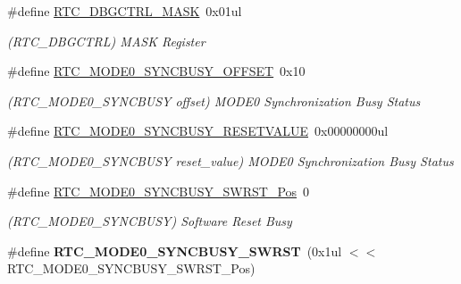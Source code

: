 \begin{DoxyCompactItemize}
\item 
\hypertarget{group___s_a_m_l21___r_t_c_ga67d70ebf86119e02a8b23f3a77ceda45}{}\#define \hyperlink{group___s_a_m_l21___r_t_c_ga67d70ebf86119e02a8b23f3a77ceda45}{R\+T\+C\+\_\+\+D\+B\+G\+C\+T\+R\+L\+\_\+\+M\+A\+S\+K}~0x01ul\label{group___s_a_m_l21___r_t_c_ga67d70ebf86119e02a8b23f3a77ceda45}

\begin{DoxyCompactList}\small\item\em (R\+T\+C\+\_\+\+D\+B\+G\+C\+T\+R\+L) M\+A\+S\+K Register \end{DoxyCompactList}\item 
\hypertarget{group___s_a_m_l21___r_t_c_ga4eb25a9c555e6fac129646b95b7b115f}{}\#define \hyperlink{group___s_a_m_l21___r_t_c_ga4eb25a9c555e6fac129646b95b7b115f}{R\+T\+C\+\_\+\+M\+O\+D\+E0\+\_\+\+S\+Y\+N\+C\+B\+U\+S\+Y\+\_\+\+O\+F\+F\+S\+E\+T}~0x10\label{group___s_a_m_l21___r_t_c_ga4eb25a9c555e6fac129646b95b7b115f}

\begin{DoxyCompactList}\small\item\em (R\+T\+C\+\_\+\+M\+O\+D\+E0\+\_\+\+S\+Y\+N\+C\+B\+U\+S\+Y offset) M\+O\+D\+E0 Synchronization Busy Status \end{DoxyCompactList}\item 
\hypertarget{group___s_a_m_l21___r_t_c_gab8b562514e7ed644644f5d071e149e90}{}\#define \hyperlink{group___s_a_m_l21___r_t_c_gab8b562514e7ed644644f5d071e149e90}{R\+T\+C\+\_\+\+M\+O\+D\+E0\+\_\+\+S\+Y\+N\+C\+B\+U\+S\+Y\+\_\+\+R\+E\+S\+E\+T\+V\+A\+L\+U\+E}~0x00000000ul\label{group___s_a_m_l21___r_t_c_gab8b562514e7ed644644f5d071e149e90}

\begin{DoxyCompactList}\small\item\em (R\+T\+C\+\_\+\+M\+O\+D\+E0\+\_\+\+S\+Y\+N\+C\+B\+U\+S\+Y reset\+\_\+value) M\+O\+D\+E0 Synchronization Busy Status \end{DoxyCompactList}\item 
\hypertarget{group___s_a_m_l21___r_t_c_gade9581a4a77c075c9b414022f28bc023}{}\#define \hyperlink{group___s_a_m_l21___r_t_c_gade9581a4a77c075c9b414022f28bc023}{R\+T\+C\+\_\+\+M\+O\+D\+E0\+\_\+\+S\+Y\+N\+C\+B\+U\+S\+Y\+\_\+\+S\+W\+R\+S\+T\+\_\+\+Pos}~0\label{group___s_a_m_l21___r_t_c_gade9581a4a77c075c9b414022f28bc023}

\begin{DoxyCompactList}\small\item\em (R\+T\+C\+\_\+\+M\+O\+D\+E0\+\_\+\+S\+Y\+N\+C\+B\+U\+S\+Y) Software Reset Busy \end{DoxyCompactList}\item 
\hypertarget{group___s_a_m_l21___r_t_c_gac4922b990a7bd2ea2e5b4687cd9bbf8a}{}\#define {\bfseries R\+T\+C\+\_\+\+M\+O\+D\+E0\+\_\+\+S\+Y\+N\+C\+B\+U\+S\+Y\+\_\+\+S\+W\+R\+S\+T}~(0x1ul $<$$<$ R\+T\+C\+\_\+\+M\+O\+D\+E0\+\_\+\+S\+Y\+N\+C\+B\+U\+S\+Y\+\_\+\+S\+W\+R\+S\+T\+\_\+\+Pos)\label{group___s_a_m_l21___r_t_c_gac4922b990a7bd2ea2e5b4687cd9bbf8a}


\end{DoxyCompactItemize}
